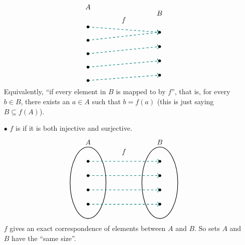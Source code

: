 \begin{definition}
\begin{itemize}
\[\begin{tikzpicture}[scale=0.9]
\draw[->,thick,dashed,teal] (0,1.5) -- (4,1.2) node[midway,above,yshift=5pt] {\color{black}$f$};
\draw[->,thick,dashed,teal] (0,0.75) -- (4,1.2);
\draw[->,thick,dashed,teal] (0,0) -- (4,0.4);
\draw[->,thick,dashed,teal] (0,-0.75) -- (4,-0.4);
\draw[->,thick,dashed,teal] (0,-1.5) -- (4,-1.2);

\filldraw (4,1.2) circle (2pt);
\filldraw (4,0.4) circle (2pt);
\filldraw (4,-0.4) circle (2pt);
\filldraw (4,-1.2) circle (2pt);

\filldraw (0,1.5) circle (2pt);
\filldraw (0,0.75) circle (2pt);
\filldraw (0,0) circle (2pt);
\filldraw (0,-0.75) circle (2pt);
\filldraw (0,-1.5) circle (2pt);

\node[above] at (0,2.35) {$A$};
\node[above] at (4,2) {$B$};
\end{tikzpicture}\]
Equivalently, ``if every element in $B$ is mapped to by $f$'', that is, for every $b \in B$, there exists an $a \in A$ such that $b = f(a)$ (this is just saying $B \subseteq f(A)$).%

\item[$\bullet$] $f$ is  if it is both injective and surjective.
\[\begin{tikzpicture}[scale=0.9]
\draw[thick] (4,0) ellipse (1cm and 2cm);
\draw[thick] (0,0) ellipse (1cm and 2cm);

\draw[->,thick,dashed,teal] (0,1.2) -- (4,1.2) node[midway,above,yshift=5pt] {\color{black}$f$};
\draw[->,thick,dashed,teal] (0,0.4) -- (4,0.4);
\draw[->,thick,dashed,teal] (0,-0.4) -- (4,-0.4);
\draw[->,thick,dashed,teal] (0,-1.2) -- (4,-1.2);

\filldraw (4,1.2) circle (2pt);
\filldraw (4,0.4) circle (2pt);
\filldraw (4,-0.4) circle (2pt);
\filldraw (4,-1.2) circle (2pt);

\filldraw (0,1.2) circle (2pt);
\filldraw (0,0.4) circle (2pt);
\filldraw (0,-0.4) circle (2pt);
\filldraw (0,-1.2) circle (2pt);

\node[above] at (0,2) {$A$};
\node[above] at (4,2) {$B$};
\end{tikzpicture}\]
$f$ gives an exact correspondence of elements between $A$ and $B$. So sets $A$ and $B$ have the ``same size''. 
\end{itemize}
\end{definition}

